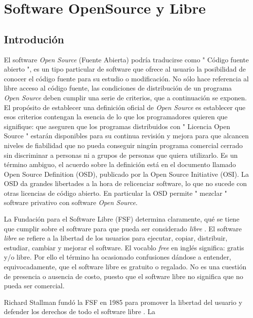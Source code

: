 \chapter{Software OpenSource y Libre}
\section{Introdución} 
	\par
	El software \textit{Open Source} (Fuente Abierta) podría traducirse como " Código fuente abierto ", es un tipo particular de software que ofrece al
	usuario la posibilidad de conocer el código fuente para su estudio o modificación. No sólo hace referencia al libre acceso al código fuente, las
	condiciones de distribución de un programa \textit{Open Source} deben cumplir una serie de criterios, que a continuación se exponen. El propósito de
	establecer una definición oficial de \textit{Open Source} es establecer que esos criterios contengan la esencia de lo que los programadores quieren que
	signifique: que aseguren que los programas distribuidos con " Licencia Open Source " estarán disponibles para su continua revisión y mejora para que
	alcancen niveles de fiabilidad que no pueda conseguir ningún programa comercial cerrado sin discriminar a personas ni a grupos de personas que
	quiera utilizarlo. Es un término ambiguo, el acuerdo sobre la definición está en el documento llamado Open Source Definition (OSD), publicado por la
	Open Source Initiative (OSI). La OSD da grandes libertades a la hora de relicenciar software, lo que no sucede con otras licencias de código
	abierto. En particular la OSD permite " mezclar " software privativo con software \textit{Open Source}.
	\vspace{0.5cm}
	\par
	La Fundación para el Software Libre (FSF) determina claramente, qué se tiene que cumplir sobre el software para que pueda ser considerado
	\textit{libre} \cite{Etiqueta07}. El software \textit{libre} se refiere a la libertad de los usuarios para ejecutar, copiar, distribuir, estudiar,
	cambiar y mejorar el software. El vocablo \textit{free} en inglés significa: gratis y/o libre. Por ello el término ha ocasionado confusiones dándose
	a entender, equivocadamente, que el software libre es gratuito o regalado. No es una cuestión de presencia o ausencia de costo, puesto que el
	software libre no significa que no pueda ser comercial.
	\vspace{0.5cm}
	\par
	Richard Stallman fundó la FSF en 1985 para promover la libertad del usuario y defender los derechos de todo el software libre \cite{Etiqueta14}. La
